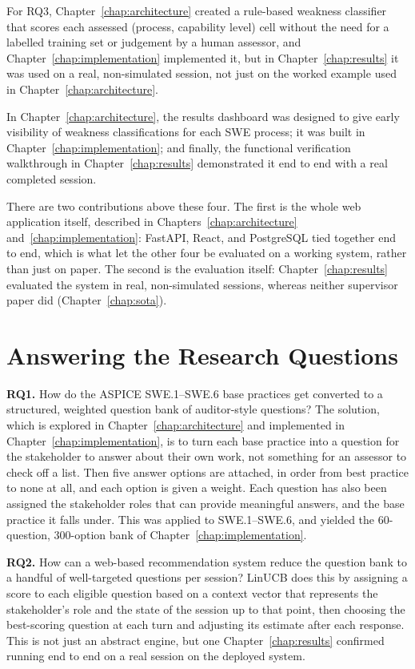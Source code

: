 \documentclass[a4paper, 12pt, oneside, openany, BCOR1cm,toc=chapterentrywithdots]{scrbook}
\begin{document}
For RQ3, Chapter~\ref{chap:architecture} created a rule-based weakness classifier that scores
each assessed (process, capability level) cell without the need for a labelled training set or
judgement by a human assessor, and Chapter~\ref{chap:implementation} implemented it, but in
Chapter~\ref{chap:results} it was used on a real, non-simulated session, not just on the worked
example used in Chapter~\ref{chap:architecture}.

In Chapter~\ref{chap:architecture}, the results dashboard was designed to give early visibility
of weakness classifications for each SWE process; it was built in
Chapter~\ref{chap:implementation}; and finally, the functional verification walkthrough in
Chapter~\ref{chap:results} demonstrated it end to end with a real completed session.

There are two contributions above these four. The first is the whole web application itself,
described in Chapters~\ref{chap:architecture} and~\ref{chap:implementation}: FastAPI, React, and
PostgreSQL tied together end to end, which is what let the other four be evaluated on a working
system, rather than just on paper. The second is the evaluation itself: Chapter~\ref{chap:results}
evaluated the system in real, non-simulated sessions, whereas neither supervisor paper did
(Chapter~\ref{chap:sota}).

\section{Answering the Research Questions}

\textbf{RQ1.} How do the ASPICE SWE.1--SWE.6 base practices get converted to a structured,
weighted question bank of auditor-style questions? The solution, which is explored in
Chapter~\ref{chap:architecture} and implemented in Chapter~\ref{chap:implementation}, is to turn
each base practice into a question for the stakeholder to answer about their own work, not
something for an assessor to check off a list. Then five answer options are attached, in order
from best practice to none at all, and each option is given a weight. Each question has also
been assigned the stakeholder roles that can provide meaningful answers, and the base practice
it falls under. This was applied to SWE.1--SWE.6, and yielded the 60-question, 300-option bank
of Chapter~\ref{chap:implementation}.

\textbf{RQ2.} How can a web-based recommendation system reduce the question bank to a handful of
well-targeted questions per session? LinUCB does this by assigning a score to each eligible
question based on a context vector that represents the stakeholder's role and the state of the
session up to that point, then choosing the best-scoring question at each turn and adjusting its
estimate after each response. This is not just an abstract engine, but one
Chapter~\ref{chap:results} confirmed running end to end on a real session on the deployed
system.
\end{document}
